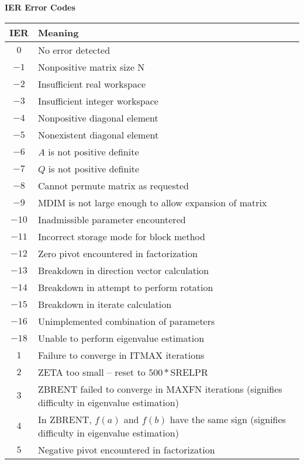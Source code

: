 \bigskip
\noindent
{\bf IER Error Codes}
\bigskip

\begin{tabular}{|c|p{3.5in}|}  \hline
       IER   &    Meaning    \\   \hline
       $0$   &    No error detected \\   \hline
      $-1$   &    Nonpositive matrix size N \\
      $-2$   &    Insufficient real workspace \\
      $-3$   &    Insufficient integer workspace \\
      $-4$   &    Nonpositive diagonal element \\
      $-5$   &    Nonexistent diagonal element \\
      $-6$   &    $A$ is not positive definite \\
      $-7$   &    $Q$ is not positive definite \\
      $-8$   &    Cannot permute matrix as requested \\
      $-9$   &    MDIM is not large enough to allow expansion
                    of matrix \\
     $-10$   &    Inadmissible parameter encountered \\
     $-11$   &    Incorrect storage mode for block method \\
     $-12$   &    Zero pivot encountered in factorization \\
     $-13$   &    Breakdown in direction vector calculation \\
     $-14$   &    Breakdown in attempt to perform rotation \\
     $-15$   &    Breakdown in iterate calculation \\
     $-16$   &    Unimplemented combination of parameters \\
     $-18$   &    Unable to perform eigenvalue estimation \\  \hline
       $1$   &    Failure to converge in ITMAX iterations \\
       $2$   &    ZETA too small -- reset to $500*$SRELPR \\
       $3$   &    ZBRENT failed to converge in MAXFN iterations
                    (signifies difficulty in eigenvalue
                     estimation)                       \\
       $4$   &    In ZBRENT, $f(a)$ and $f(b)$ have the same sign
                        (signifies difficulty in eigenvalue
                         estimation)                  \\
       $5$   &    Negative pivot encountered in factorization  \\
                  \hline
\end{tabular}

